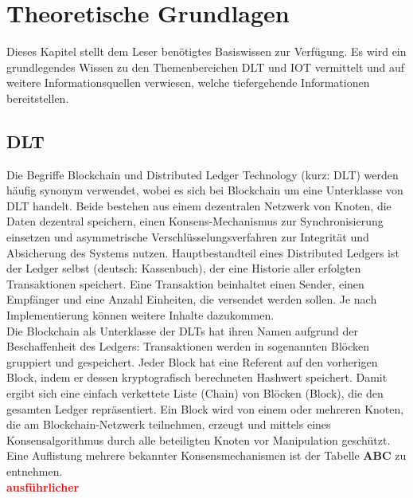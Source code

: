 \chapter{Theoretische Grundlagen}
\label{ch:fundamentals}
Dieses Kapitel stellt dem Leser benötigtes Basiswissen zur Verfügung. Es wird ein grundlegendes Wissen zu den Themenbereichen \ac{DLT} und \ac{IOT} vermittelt und auf weitere Informationsquellen verwiesen, welche tiefergehende Informationen bereitstellen.

%
%
\section{DLT}
\label{sec:fundamentals:dlt}
Die Begriffe Blockchain und Distributed Ledger Technology (kurz: \ac{DLT}) werden häufig synonym verwendet, wobei es sich bei Blockchain um eine Unterklasse von \ac{DLT} handelt. Beide bestehen aus einem dezentralen Netzwerk von Knoten, die Daten dezentral speichern, einen Konsens-Mechanismus zur Synchronisierung einsetzen und asymmetrische Verschlüsselungsverfahren zur Integrität und Absicherung des Systems nutzen. Hauptbestandteil eines Distributed Ledgers ist der Ledger selbst (deutsch: Kassenbuch), der eine Historie aller erfolgten Transaktionen speichert. Eine Transaktion beinhaltet einen Sender, einen Empfänger und eine Anzahl Einheiten, die versendet werden sollen. Je nach Implementierung können weitere Inhalte dazukommen.\\
Die Blockchain als Unterklasse der \ac{DLT}s hat ihren Namen aufgrund der Beschaffenheit des Ledgers: Transaktionen werden in sogenannten Blöcken gruppiert und gespeichert. Jeder Block hat eine Referent auf den vorherigen Block, indem er dessen kryptografisch berechneten Hashwert speichert. Damit ergibt sich eine einfach verkettete Liste (Chain) von Blöcken (Block), die den gesamten Ledger repräsentiert. Ein Block wird von einem oder mehreren Knoten, die am Blockchain-Netzwerk teilnehmen, erzeugt und mittels eines Konsensalgorithmus durch alle beteiligten Knoten vor Manipulation geschützt. Eine Auflistung mehrere bekannter Konsensmechanismen ist der Tabelle \textbf{ABC} zu entnehmen.\\%
\textbf{\textcolor{red}{ausführlicher}}



